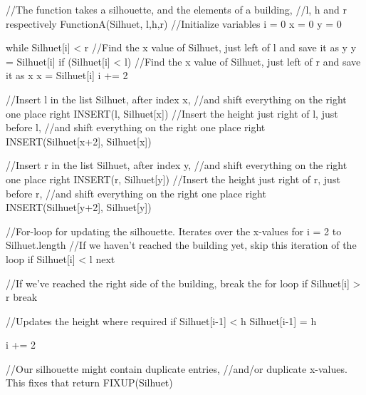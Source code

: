 \documentclass[a4paper,oneside,article,11pt]{memoir}
\begin{document}
\begin{VerbatimTest}
//The function takes a silhouette, and the elements of a building,
//l, h and r respectively
FunctionA(Silhuet, l,h,r)
    //Initialize variables
    i = 0
    x = 0
    y = 0

    while Silhuet[i] < r
        //Find the x value of Silhuet, just left of l and save it as y
        y = Silhuet[i]
        if (Silhuet[i] < l)
            //Find the x value of Silhuet, just left of r and save it as x
            x = Silhuet[i]
        i += 2

    //Insert l in the list Silhuet, after index x,
    //and shift everything on the right one place right
    INSERT(l, Silhuet[x])
    //Insert the height just right of l, just before l,
    //and shift everything on the right one place right
    INSERT(Silhuet[x+2], Silhuet[x])

     //Insert r in the list Silhuet, after index y,
     //and shift everything on the right one place right
    INSERT(r, Silhuet[y])
    //Insert the height just right of r, just before r,
    //and shift everything on the right one place right
    INSERT(Silhuet[y+2], Silhuet[y])

    //For-loop for updating the silhouette. Iterates over the x-values
    for i = 2 to Silhuet.length
        //If we haven't reached the building yet, skip this iteration of the loop
        if Silhuet[i] < l
            next

        //If we've reached the right side of the building, break the for loop
        if Silhuet[i] > r
            break

        //Updates the height where required
        if Silhuet[i-1] < h             
            Silhuet[i-1] = h

        i += 2
    
    //Our silhouette might contain duplicate entries,
    //and/or duplicate x-values. This fixes that
    return FIXUP(Silhuet)
\end{VerbatimTest}
\end{document}
